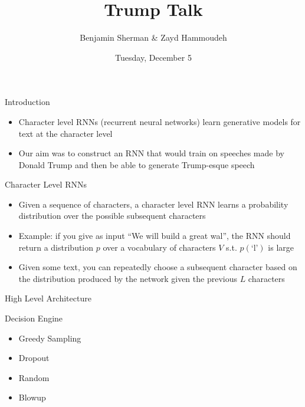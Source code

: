 \documentclass{beamer}
\title{Trump Talk}
\author{Benjamin Sherman \& Zayd Hammoudeh}
\institute{Computer Science 242 Fall 2017 @ UCSC}
\date{Tuesday, December 5}
\begin{document}
	
	\begin{frame}
		\titlepage
	\end{frame}
	
	\begin{frame}{Introduction}
		
		\begin{itemize}
			\item Character level RNNs (recurrent neural networks) learn generative models for text at the character level
			
			\item Our aim was to construct an RNN that would train on speeches made by Donald Trump and then be able to generate Trump-esque speech
			
		\end{itemize}
		
	\end{frame}
	
	\begin{frame}{Character Level RNNs}
		
		\begin{itemize}
			\item Given a sequence of characters, a character level RNN learns a probability distribution over the possible subsequent characters
			
			\item Example: if you give as input ``We will build a great wal'', the RNN should return a distribution $p$ over a vocabulary of characters $V$ s.t. $p(\text{`l'})$ is large
			
			\item Given some text, you can repeatedly choose a subsequent character based on the distribution produced by the network given the previous $L$ characters
			
		\end{itemize}
		
	\end{frame}
	
	\begin{frame}{High Level Architecture}
		
		
	\end{frame}
	
	\begin{frame}{Decision Engine}
		
		\begin{itemize}
			\item Greedy Sampling
			\item Dropout
			\item Random
			\item Blowup %
		\end{itemize}
		
	\end{frame}
	
\end{document}
